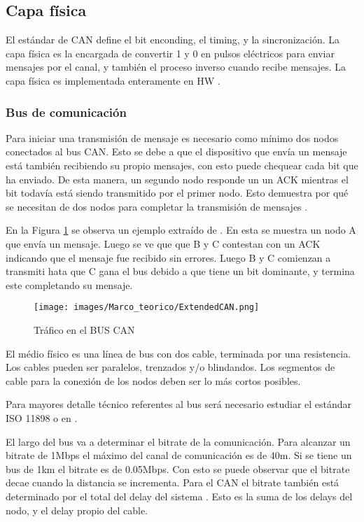 \subsection{Capa física}
El estándar de CAN define el bit enconding, el timing, y la sincronización. La capa física es la encargada de convertir 1 y 0 en pulsos eléctricos para enviar mensajes por el canal, y también el proceso inverso cuando recibe mensajes. La capa física es implementada enteramente en \ac{HW} \citep{texasFISICACAN}.

\subsubsection{Bus de comunicación}
Para iniciar una transmisión de mensaje es necesario como mínimo dos nodos conectados al bus CAN. Esto se debe a que el dispositivo que envía un mensaje está también recibiendo su propio mensajes, con esto puede chequear cada bit que ha enviado. De esta manera, un segundo nodo responde un un ACK mientras el bit todavía está siendo transmitido por el primer nodo. Esto demuestra por qué se necesitan de dos nodos para completar la transmisión de mensajes \citep{texasFISICACAN}.

En la Figura \ref{fig:traficBUSCAN} se observa un ejemplo extraído de \citep{texasFISICACAN}. En esta se muestra un nodo A que envía un mensaje. Luego se ve que que B y C contestan con un ACK indicando que el mensaje fue recibido sin errores. Luego B y C comienzan a transmiti hata que C gana el bus debido a que tiene un bit dominante, y termina este completando su mensaje.

\begin{figure}[h]
 \centering
 \texttt{[image: images/Marco\_teorico/ExtendedCAN.png]}
  \caption{Tráfico en el BUS CAN}
\label{fig:traficBUSCAN}
\end{figure}

El médio físico  es una línea de bus con dos cable, terminada por una resistencia. Los cables pueden ser paralelos, trenzados y/o blindandos. Los segmentos de cable para la conexión de los nodos deben ser lo más cortos posibles.

Para mayores detalle técnico referentes al bus será necesario estudiar el estándar ISO 11898 o en \cite{texasFISICACAN}.

El largo del bus va a determinar el bitrate de la comunicación. Para alcanzar un bitrate de 1Mbps el máximo del canal de comunicación es de 40m. Si se tiene un bus de 1km el bitrate es de 0.05Mbps. Con esto se puede observar que el bitrate decae cuando la distancia se incrementa. Para el CAN el bitrate también está determinado por el total del delay del sistema \citep{texasFISICACAN}. Esto es la suma de los delays del nodo, y el delay propio del cable.


